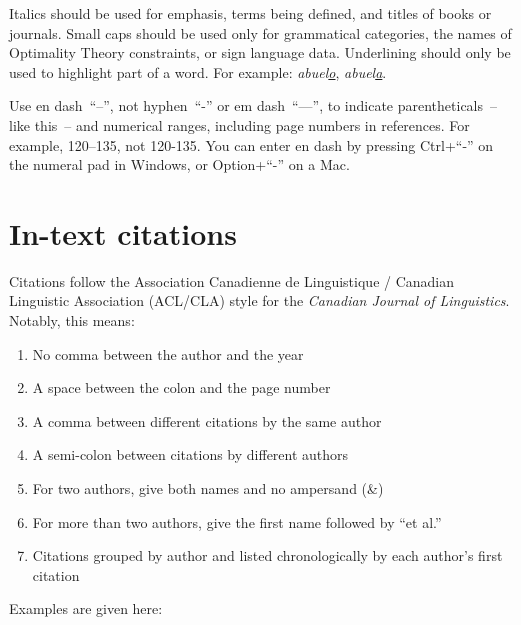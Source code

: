 \documentclass[xelatex,linguex]{TWPL}
\begin{document}
Italics should be used for emphasis, terms being defined, and titles of books or journals. Small caps should be used only for grammatical categories, the names of Optimality Theory constraints, or sign language data. Underlining should only be used to highlight part of a word. For example: \emph{abuel\uline{o}}, \emph{abuel\uline{a}}. %

Use en dash~``–'', not hyphen~``-'' or em dash~``—'', to indicate parentheticals~– like this~– and numerical ranges, including page numbers in references. For example, 120–135, not 120-135. You can enter en dash by pressing Ctrl+``-'' on the numeral pad in Windows, or Option+``-'' on a Mac.  %

\section{In-text citations}

Citations follow the Association Canadienne de Linguistique / Canadian Linguistic Association (ACL/CLA) style for the \emph{Canadian Journal of Linguistics}. Notably, this means:

\begin{enumerate}\setlength\itemsep{-0.75ex}
\item No comma between the author and the year
\item A space between the colon and the page number
\item A comma between different citations by the same author
\item A semi-colon between citations by different authors
\item For two authors, give both names and no ampersand (\&)
\item For more than two authors, give the first name followed by ``et al.''
\item Citations grouped by author and listed chronologically by each author's first citation
\end{enumerate}

Examples are given here:
\end{document}
